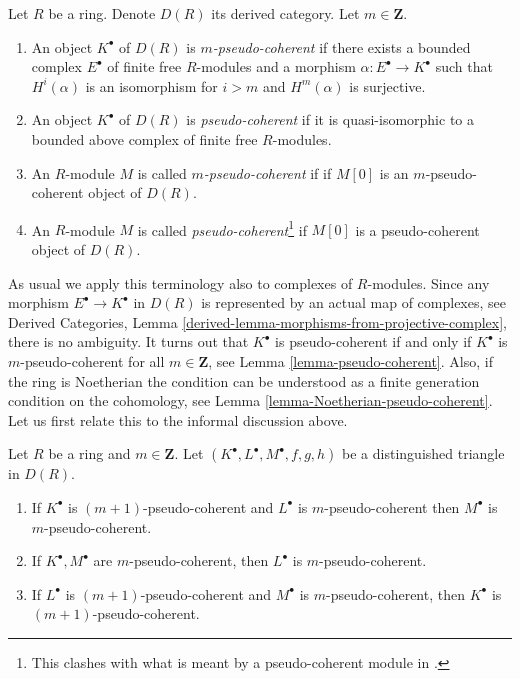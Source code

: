 \begin{definition}
\label{definition-pseudo-coherent}
Let $R$ be a ring. Denote $D(R)$ its derived category.
Let $m \in \mathbf{Z}$.
\begin{enumerate}
\item An object $K^\bullet$ of $D(R)$ is {\it $m$-pseudo-coherent}
if there exists a bounded complex $E^\bullet$ of finite free $R$-modules
and a morphism $\alpha : E^\bullet \to K^\bullet$ such that
$H^i(\alpha)$ is an isomorphism for $i > m$ and $H^m(\alpha)$
is surjective.
\item An object $K^\bullet$ of $D(R)$ is {\it pseudo-coherent}
if it is quasi-isomorphic to a bounded above complex of finite
free $R$-modules.
\item An $R$-module $M$ is called {\it $m$-pseudo-coherent} if
if $M[0]$ is an $m$-pseudo-coherent object of $D(R)$.
\item An $R$-module $M$ is called
{\it pseudo-coherent}\footnote{This clashes with what is meant by
a pseudo-coherent module in \cite{Bourbaki-CA}.}
if $M[0]$ is a pseudo-coherent object of $D(R)$.
\end{enumerate}
\end{definition}

\noindent
As usual we apply this terminology also to complexes of $R$-modules.
Since any morphism $E^\bullet \to K^\bullet$ in $D(R)$ is represented
by an actual map of complexes, see
Derived Categories, Lemma \ref{derived-lemma-morphisms-from-projective-complex},
there is no ambiguity.
It turns out that $K^\bullet$ is pseudo-coherent if and only if
$K^\bullet$ is $m$-pseudo-coherent for all $m \in \mathbf{Z}$, see
Lemma \ref{lemma-pseudo-coherent}.
Also, if the ring is Noetherian the condition can be understood
as a finite generation condition on the cohomology, see
Lemma \ref{lemma-Noetherian-pseudo-coherent}.
Let us first relate this to the informal discussion above.

\begin{lemma}
\label{lemma-cone-pseudo-coherent}
Let $R$ be a ring and $m \in \mathbf{Z}$.
Let $(K^\bullet, L^\bullet, M^\bullet, f, g, h)$ be a distinguished
triangle in $D(R)$.
\begin{enumerate}
\item If $K^\bullet$ is $(m + 1)$-pseudo-coherent and
$L^\bullet$ is $m$-pseudo-coherent then $M^\bullet$ is
$m$-pseudo-coherent.
\item If $K^\bullet, M^\bullet$ are $m$-pseudo-coherent, then
$L^\bullet$ is $m$-pseudo-coherent.
\item If $L^\bullet$ is $(m + 1)$-pseudo-coherent and $M^\bullet$
is $m$-pseudo-coherent, then $K^\bullet$ is $(m + 1)$-pseudo-coherent.
\end{enumerate}
\end{lemma}

